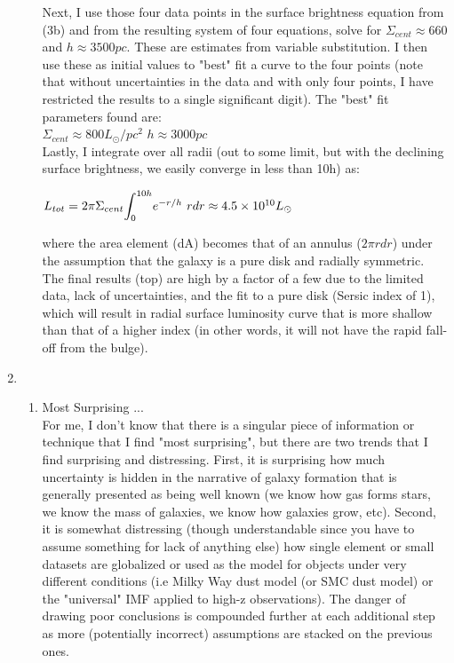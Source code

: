 \documentclass[11pt]{article}
\begin{document}
\begin{enumerate}
\begin{enumerate}
	Next, I use those four data points in the surface brightness equation from (3b) and from the resulting system of four equations, solve for $\Sigma_{cent} \approx 660$ and $h \approx 3500pc$. These are estimates from variable substitution. I then use these as initial values to "best" fit a curve to the four points (note that without uncertainties in the data and with only four points, I have restricted the results to a single significant digit). The "best" fit parameters found are:\\
	
	\hspace{10mm} $\Sigma_{cent} \approx 800 L_{\odot}/pc^{2}$ \hspace{5mm}  $h \approx 3000 pc$\\
	
	Lastly, I integrate over all radii (out to some limit, but with the declining surface brightness, we easily converge in less than 10h) as:
	
	\hspace{10mm} $L_{tot} = 2\pi \Sigma_{cent} \mathlarger{\int_{0}^{10h}} e^{-r/h}\ r dr \approx 4.5\times10^{10} L_{\odot} $ 
	

	where the area element (dA) becomes that of an annulus ($2\pi rdr$) under the assumption that the galaxy is a pure disk and radially symmetric.\\  
	
	The final results (top) are high by a factor of a few due to the limited data, lack of uncertainties, and the fit to a pure disk (Sersic index of 1), which will result in radial surface luminosity curve that is more shallow than that of a higher index (in other words, it will not have the rapid fall-off from the bulge).
	     
  
  \end{enumerate}
  
  \item 
  
  \begin{enumerate}
  
  \item Most Surprising ...\\
  
  For me, I don't know that there is a singular piece of information or technique that I find "most surprising", but there are two trends that I find surprising and distressing. First, it is surprising how much uncertainty is hidden in the narrative of galaxy formation that is generally presented as being well known (we know how gas forms stars, we know the mass of galaxies, we know how galaxies grow, etc). Second, it is somewhat distressing (though understandable since you have to assume something for lack of anything else) how single element or small datasets are globalized or used as the model for objects under very different conditions (i.e Milky Way dust model (or SMC dust model) or the "universal" IMF applied to high-z observations). The danger of drawing poor conclusions is compounded further at each additional step as more (potentially incorrect) assumptions are stacked on the previous ones.\\
  

\end{enumerate}
\end{enumerate}
\end{document}
